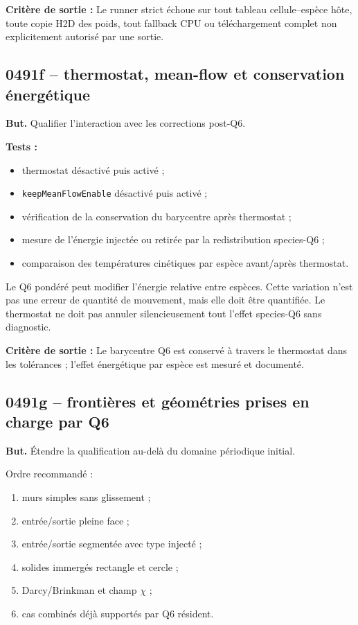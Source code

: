\documentclass[11pt,a4paper]{article}
\newcommand{\code}[1]{\texttt{#1}}
\newcommand{\criterion}[1]{\colorbox{softgreen}{\parbox{0.93\linewidth}{\textbf{Critère de sortie :} #1}}}
\begin{document}
\criterion{Le runner strict échoue sur tout tableau cellule--espèce hôte, toute copie H2D des poids, tout fallback CPU ou téléchargement complet non explicitement autorisé par une sortie.}

\subsection{0491f -- thermostat, mean-flow et conservation énergétique}

\textbf{But.} Qualifier l'interaction avec les corrections post-Q6.

\textbf{Tests :}
\begin{itemize}
  \item thermostat désactivé puis activé ;
  \item \code{keepMeanFlowEnable} désactivé puis activé ;
  \item vérification de la conservation du barycentre après thermostat ;
  \item mesure de l'énergie injectée ou retirée par la redistribution species-Q6 ;
  \item comparaison des températures cinétiques par espèce avant/après thermostat.
\end{itemize}

Le Q6 pondéré peut modifier l'énergie relative entre espèces. Cette variation n'est pas une erreur de quantité de mouvement, mais elle doit être quantifiée. Le thermostat ne doit pas annuler silencieusement tout l'effet species-Q6 sans diagnostic.

\criterion{Le barycentre Q6 est conservé à travers le thermostat dans les tolérances ; l'effet énergétique par espèce est mesuré et documenté.}

\subsection{0491g -- frontières et géométries prises en charge par Q6}

\textbf{But.} Étendre la qualification au-delà du domaine périodique initial.

Ordre recommandé :
\begin{enumerate}
  \item murs simples sans glissement ;
  \item entrée/sortie pleine face ;
  \item entrée/sortie segmentée avec type injecté ;
  \item solides immergés rectangle et cercle ;
  \item Darcy/Brinkman et champ \(\chi\) ;
  \item cas combinés déjà supportés par Q6 résident.
\end{enumerate}
\end{document}
